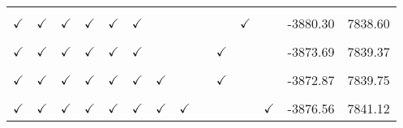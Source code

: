 \begin{table}[!h]
\begin{tabular}[t]{llllllllllllrr}
\cellcolor{gray!10}{$\checkmark$} & \cellcolor{gray!10}{$\checkmark$} & \cellcolor{gray!10}{$\checkmark$} & \cellcolor{gray!10}{$\checkmark$} & \cellcolor{gray!10}{$\checkmark$} & \cellcolor{gray!10}{$\checkmark$} & \cellcolor{gray!10}{} & \cellcolor{gray!10}{} & \cellcolor{gray!10}{$\checkmark$} & \cellcolor{gray!10}{} & \cellcolor{gray!10}{} & \cellcolor{gray!10}{} & \cellcolor{gray!10}{-3881.16} & \cellcolor{gray!10}{7838.31}\\
$\checkmark$ & $\checkmark$ & $\checkmark$ & $\checkmark$ & $\checkmark$ & $\checkmark$ &  &  &  &  & $\checkmark$ &  & -3880.30 & 7838.60\\
\cellcolor{gray!10}{$\checkmark$} & \cellcolor{gray!10}{$\checkmark$} & \cellcolor{gray!10}{$\checkmark$} & \cellcolor{gray!10}{$\checkmark$} & \cellcolor{gray!10}{$\checkmark$} & \cellcolor{gray!10}{$\checkmark$} & \cellcolor{gray!10}{$\checkmark$} & \cellcolor{gray!10}{$\checkmark$} & \cellcolor{gray!10}{} & \cellcolor{gray!10}{} & \cellcolor{gray!10}{} & \cellcolor{gray!10}{} & \cellcolor{gray!10}{-3876.56} & \cellcolor{gray!10}{7839.12}\\
$\checkmark$ & $\checkmark$ & $\checkmark$ & $\checkmark$ & $\checkmark$ & $\checkmark$ &  &  &  & $\checkmark$ &  &  & -3873.69 & 7839.37\\
\cellcolor{gray!10}{$\checkmark$} & \cellcolor{gray!10}{$\checkmark$} & \cellcolor{gray!10}{$\checkmark$} & \cellcolor{gray!10}{$\checkmark$} & \cellcolor{gray!10}{$\checkmark$} & \cellcolor{gray!10}{$\checkmark$} & \cellcolor{gray!10}{$\checkmark$} & \cellcolor{gray!10}{} & \cellcolor{gray!10}{$\checkmark$} & \cellcolor{gray!10}{} & \cellcolor{gray!10}{} & \cellcolor{gray!10}{} & \cellcolor{gray!10}{-3880.85} & \cellcolor{gray!10}{7839.71}\\
$\checkmark$ & $\checkmark$ & $\checkmark$ & $\checkmark$ & $\checkmark$ & $\checkmark$ & $\checkmark$ &  &  & $\checkmark$ &  &  & -3872.87 & 7839.75\\
\cellcolor{gray!10}{$\checkmark$} & \cellcolor{gray!10}{$\checkmark$} & \cellcolor{gray!10}{$\checkmark$} & \cellcolor{gray!10}{$\checkmark$} & \cellcolor{gray!10}{$\checkmark$} & \cellcolor{gray!10}{$\checkmark$} & \cellcolor{gray!10}{$\checkmark$} & \cellcolor{gray!10}{} & \cellcolor{gray!10}{} & \cellcolor{gray!10}{} & \cellcolor{gray!10}{$\checkmark$} & \cellcolor{gray!10}{} & \cellcolor{gray!10}{-3879.88} & \cellcolor{gray!10}{7839.77}\\
$\checkmark$ & $\checkmark$ & $\checkmark$ & $\checkmark$ & $\checkmark$ & $\checkmark$ & $\checkmark$ & $\checkmark$ &  &  &  & $\checkmark$ & -3876.56 & 7841.12\\

\end{tabular}
\end{table}

